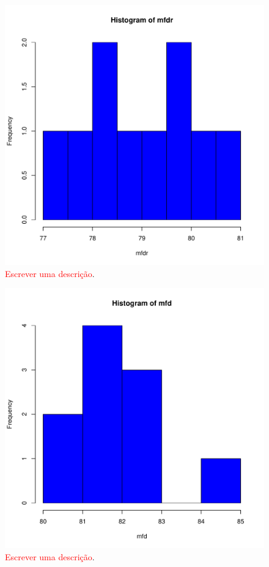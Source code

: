 \documentclass[conference]{IEEEtran}
\begin{document}
\begin{figure}[h]
	\centering
	\includegraphics[width=\linewidth]{img/bluehist_mfdr.pdf}
	\caption{\textcolor{red}{Escrever uma descrição}.}
	\label{fig:hist_mfdr}
\end{figure}

\begin{figure}[h]
	\centering
	\includegraphics[width=\linewidth]{img/bluehist_mfd.pdf}
	\caption{\textcolor{red}{Escrever uma descrição}.}
	\label{fig:hist_mfd}
\end{figure}
\end{document}
